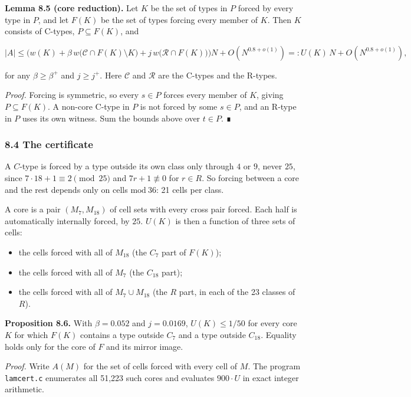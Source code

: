 \documentclass[
  11pt,
]{article}
\providecommand{\tightlist}{%
  \setlength{\itemsep}{0pt}\setlength{\parskip}{0pt}}
\begin{document}
\textbf{Lemma 8.5 (core reduction).} Let \(K\) be the set of types in
\(P\) forced by every type in \(P\), and let \(F(K)\) be the set of
types forcing every member of \(K\). Then \(K\) consists of C-types,
\(P \subseteq F(K)\), and

\[|A| \le \Big(w(K) + \beta\, w\big(\mathcal C\cap F(K)\setminus K\big) + j\, w\big(\mathcal R\cap F(K)\big)\Big)N + O(N^{0.8+o(1)}) =: U(K)\,N + O(N^{0.8+o(1)}),\]

for any \(\beta \ge \beta^{+}\) and \(j \ge j^{+}\). Here
\(\mathcal{C}\) and \(\mathcal{R}\) are the C-types and the R-types.

\emph{Proof.} Forcing is symmetric, so every \(s \in P\) forces every
member of \(K\), giving \(P \subseteq F(K)\). A non-core C-type in \(P\)
is not forced by some \(s \in P\), and an R-type in \(P\) uses its own
witness. Sum the bounds above over \(t \in P\). ∎

\subsubsection{8.4 The certificate}

A \(C\)-type is forced by a type outside its own class only through
\(4\) or \(9\), never \(25\), since \(7\cdot 18 + 1 \equiv 2 \pmod{25}\)
and \(7r + 1 \not\equiv 0\) for \(r \in R\). So forcing between a core
and the rest depends only on cells \(\mathrm{mod}\ 36\): 21 cells per
class.

A core is a pair \((M_7, M_{18})\) of cell sets with every cross pair
forced. Each half is automatically internally forced, by \(25\).
\(U(K)\) is then a function of three sets of cells:

\begin{itemize}
\tightlist
\item
  the cells forced with all of \(M_{18}\) (the \(C_7\) part of
  \(F(K)\));
\item
  the cells forced with all of \(M_7\) (the \(C_{18}\) part);
\item
  the cells forced with all of \(M_7 \cup M_{18}\) (the \(R\) part, in
  each of the 23 classes of \(R\)).
\end{itemize}

\textbf{Proposition 8.6.} With \(\beta = 0.052\) and \(j = 0.0169\),
\(U(K) \le 1/50\) for every core \(K\) for which \(F(K)\) contains a
type outside \(C_7\) and a type outside \(C_{18}\). Equality holds only
for the core of \(F\) and its mirror image.

\emph{Proof.} Write \(A(M)\) for the set of cells forced with every cell
of \(M\). The program \texttt{lamcert.c} enumerates all 51,223 such
cores and evaluates \(900\cdot U\) in exact integer arithmetic.
\end{document}
